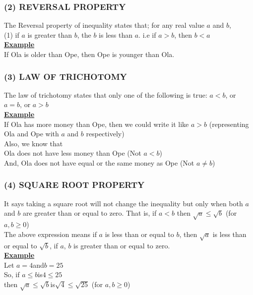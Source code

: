\documentclass[12pt]{report}
\newcommand{\ubt}[1]{\textbf{\underline{#1}}}
\newcommand{\NI}{\noindent}
\begin{document}
	\subsubsection{(2) REVERSAL PROPERTY}
	The Reversal property of inequality states that; for any real value $a$ and $b$,\\
	(1) if $a$ is greater than $b$, the $b$ is less than $a$. i.e if $a>b$, then $b<a$\\
	\ubt{Example}\\
	If Ola is older than Ope, then Ope is younger than Ola.
	
	\subsubsection{(3) LAW OF TRICHOTOMY}
	The law of trichotomy states that only one of the following is true: $a<b$, or $a=b$, or $a>b$\\
	
	\NI\ubt{Example}\\
	If Ola has more money than Ope, then we could write it like $a>b$ (representing Ola and Ope with $a$ and $b$ respectively)\\
	Also, we know that\\
	
	\NI Ola does not have less money than Ope (Not $a<b$)\\
	And, Ola does not have equal or the same money as Ope (Not $a \neq b$)
	
	\subsubsection{(4) SQUARE ROOT PROPERTY}
	It says taking a square root will not change the inequality but only when both $a$ and $b$ are greater than or equal to zero. That is, if $a<b$ then $\sqrt{a} \leq \sqrt{b}$ (for $a,b\geq 0$)\\
	
	\NI The above expression means if $a$ is less than or equal to $b$, then $\sqrt{a}$ is less than or equal to $\sqrt{b}$, if $a$, $b$ is greater than or equal to zero.\\
	
	\NI\ubt{Example}\\
	Let $a=4$\quad and\quad $b=25$\\
	So, if $a\leq b$\quad is\quad $4\leq 25$\\
	then $\sqrt{a} \leq \sqrt{b}$\quad is\quad $\sqrt{4} \leq \sqrt{25}$ (for $a,b \geq0$)
	
\end{document}
